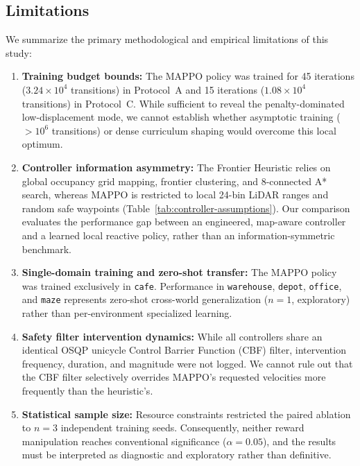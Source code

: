 \documentclass[11pt]{article}
\begin{document}
\subsection{Limitations}
\label{sec:limitations}
We summarize the primary methodological and empirical limitations of this study:
\begin{enumerate}
    \item \textbf{Training budget bounds:} The MAPPO policy was trained for 45 iterations ($3.24\times 10^4$ transitions) in Protocol~A and 15 iterations ($1.08\times 10^4$ transitions) in Protocol~C. While sufficient to reveal the penalty-dominated low-displacement mode, we cannot establish whether asymptotic training ($>10^6$ transitions) or dense curriculum shaping would overcome this local optimum.
    \item \textbf{Controller information asymmetry:} The Frontier Heuristic relies on global occupancy grid mapping, frontier clustering, and 8-connected A* search, whereas MAPPO is restricted to local 24-bin LiDAR ranges and random safe waypoints (Table~\ref{tab:controller-assumptions}). Our comparison evaluates the performance gap between an engineered, map-aware controller and a learned local reactive policy, rather than an information-symmetric benchmark.
    \item \textbf{Single-domain training and zero-shot transfer:} The MAPPO policy was trained exclusively in \texttt{cafe}. Performance in \texttt{warehouse}, \texttt{depot}, \texttt{office}, and \texttt{maze} represents zero-shot cross-world generalization ($n{=}1$, exploratory) rather than per-environment specialized learning.
    \item \textbf{Safety filter intervention dynamics:} While all controllers share an identical OSQP unicycle Control Barrier Function (CBF) filter, intervention frequency, duration, and magnitude were not logged. We cannot rule out that the CBF filter selectively overrides MAPPO's requested velocities more frequently than the heuristic's.
    \item \textbf{Statistical sample size:} Resource constraints restricted the paired ablation to $n=3$ independent training seeds. Consequently, neither reward manipulation reaches conventional significance ($\alpha = 0.05$), and the results must be interpreted as diagnostic and exploratory rather than definitive.
\end{enumerate}
\end{document}
